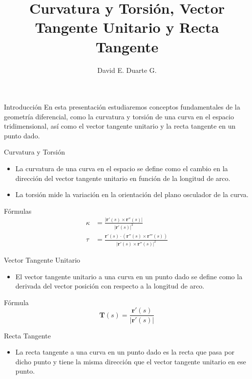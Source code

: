 \documentclass{beamer}
\title{Curvatura y Torsión, Vector Tangente Unitario y Recta Tangente}
\author{David E. Duarte G.}
\date{}
\begin{document}
	
	\frame{\titlepage}
	
	\begin{frame}{Introducción}
		En esta presentación estudiaremos conceptos fundamentales de la geometría diferencial, como la curvatura y torsión de una curva en el espacio tridimensional, así como el vector tangente unitario y la recta tangente en un punto dado.
	\end{frame}
	
	\begin{frame}{Curvatura y Torsión}
		\begin{itemize}
			\item La curvatura de una curva en el espacio se define como el cambio en la dirección del vector tangente unitario en función de la longitud de arco.
			\item La torsión mide la variación en la orientación del plano osculador de la curva.
		\end{itemize}
	\end{frame}
	
	\begin{frame}{Fórmulas}
		\begin{align*}
			\kappa &= \frac{\lvert \textbf{r}'(s) \times \textbf{r}''(s) \rvert}{\lvert \textbf{r}'(s) \rvert^3} \\
			\tau &= \frac{\textbf{r}'(s) \cdot (\textbf{r}''(s) \times \textbf{r}'''(s))}{\lvert \textbf{r}'(s) \times \textbf{r}''(s) \rvert^2}
		\end{align*}
	\end{frame}
	
	\begin{frame}{Vector Tangente Unitario}
		\begin{itemize}
			\item El vector tangente unitario a una curva en un punto dado se define como la derivada del vector posición con respecto a la longitud de arco.
		\end{itemize}
	\end{frame}
	
	\begin{frame}{Fórmula}
		\begin{equation*}
			\textbf{T}(s) = \frac{\textbf{r}'(s)}{\lvert \textbf{r}'(s) \rvert}
		\end{equation*}
	\end{frame}
	
	\begin{frame}{Recta Tangente}
		\begin{itemize}
			\item La recta tangente a una curva en un punto dado es la recta que pasa por dicho punto y tiene la misma dirección que el vector tangente unitario en ese punto.
		\end{itemize}
	\end{frame}
	
\end{document}
